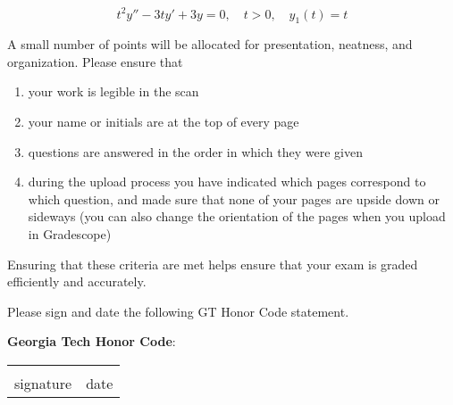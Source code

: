 \documentclass[12pt]{exam}
\begin{document}
\begin{questions}
    $$t^2y'' - 3ty' + 3y = 0, \quad t > 0, \quad y_1(t) = t$$
    
    \newpage \InitialsLeft
    

    \question[2] A small number of points will be allocated for presentation, neatness, and organization. Please ensure that
    \begin{enumerate}
        \item your work is legible in the scan
        \item your name or initials are at the top of every page
        \item questions are answered in the order in which they were given
        \item during the upload process you have indicated which pages correspond to which question, and made sure that none of your pages are upside down or sideways (you can also change the orientation of the pages when you upload in Gradescope)
    \end{enumerate}
    Ensuring that these criteria are met helps ensure that your exam is graded efficiently and accurately. 
    


    
\end{questions}
    
    Please sign and date the following GT Honor Code statement. \\ 
    \vspace{2pt}
    
    \textbf{Georgia Tech Honor Code}:\ \GTHonorCode
    
    \begin{center}
    \begin{center}
        \def\arraystretch{0.35}%
        \begin{tabular}{ b{8cm} b{8cm} }
        \vspace{.5cm} \underline{\hspace{7cm}} & \vspace{.5cm} \underline{\hspace{4.5cm}}  \tabularnewline
        \vspace{6pt} signature & \vspace{6pt} date    
        \end{tabular}
    \end{center}
    \end{center}    
\end{document}
